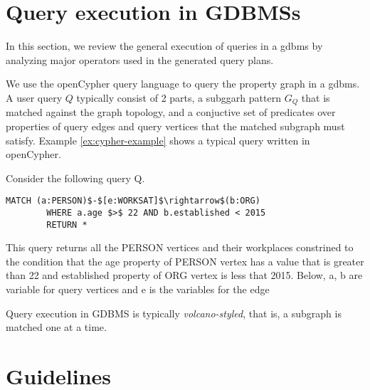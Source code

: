 \section{Query execution in GDBMSs}
\label{sec:operators}

In this section, we review the general execution of queries in a \gls{gdbms} by analyzing major operators used in the generated query plans.

We use the openCypher query language \cite{cypher} to query the property graph in a \gls{gdbms}.  A user query $Q$ typically consist of 2 parts, 
a subggarh pattern $G_Q$ that is matched against the graph topology, and a conjuctive set of predicates over properties of query edges and query vertices that the matched subgraph must satisfy. Example \ref{ex:cypher-example} shows a typical query written in openCypher.

\vspace{-4pt}
\begin{example}
	\label{ex:cypher-example}
	Consider the following query Q. 
	{\em 
		\begin{lstlisting}[numbers=none,  showstringspaces=false,belowskip=0pt ]
		MATCH (a:PERSON)$-$[e:WORKSAT]$\rightarrow$(b:ORG)
		WHERE a.age $>$ 22 AND b.established < 2015
		RETURN *\end{lstlisting}
	}
This query returns all the PERSON vertices and their workplaces constrined to the condition that the age property of PERSON vertex has a value that is greater than 22 and established property of ORG vertex is less that 2015. Below, a, b are variable for query vertices and e is the  variables for the edge
\end{example}
\vspace{-5pt}

Query execution in GDBMS is typically \emph{volcano-styled}, that is, a subgraph is matched one at a time. 


\section{Guidelines}
\label{sec:guidelines}


